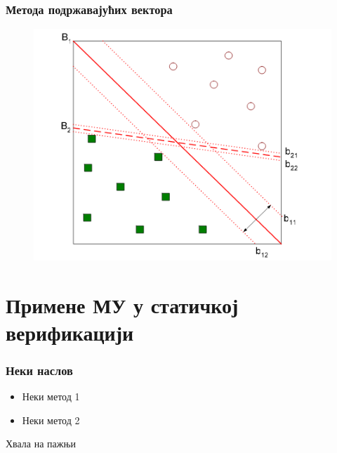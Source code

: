 \documentclass{beamer}
\begin{document}
\begin{frame}
\frametitle{Метода подржавајућих вектора}
\begin{figure}
\centering
\includegraphics[scale=0.4]{slike/svm.png}
\end{figure}
\end{frame}



\section{Примене МУ у статичкој верификацији}

\begin{frame}
\frametitle{Неки наслов}
\begin{itemize}
\item Неки метод 1
\item Неки метод 2
\end{itemize}
\end{frame}
\begin{frame}
\Huge{\centerline{Хвала на пажњи}}
\end{frame}



\end{document}
